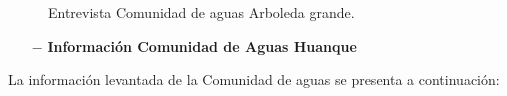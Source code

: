 \documentclass[]{article}
\begin{document}
\begin{figure} [H]
	\caption{Entrevista Comunidad de aguas Arboleda grande.}
\end{figure}

\begin{itemize}
	\item[$-$] \textbf{Información Comunidad de Aguas Huanque}
\end{itemize}

La información levantada de la Comunidad de aguas se presenta a continuación:
\end{document}

